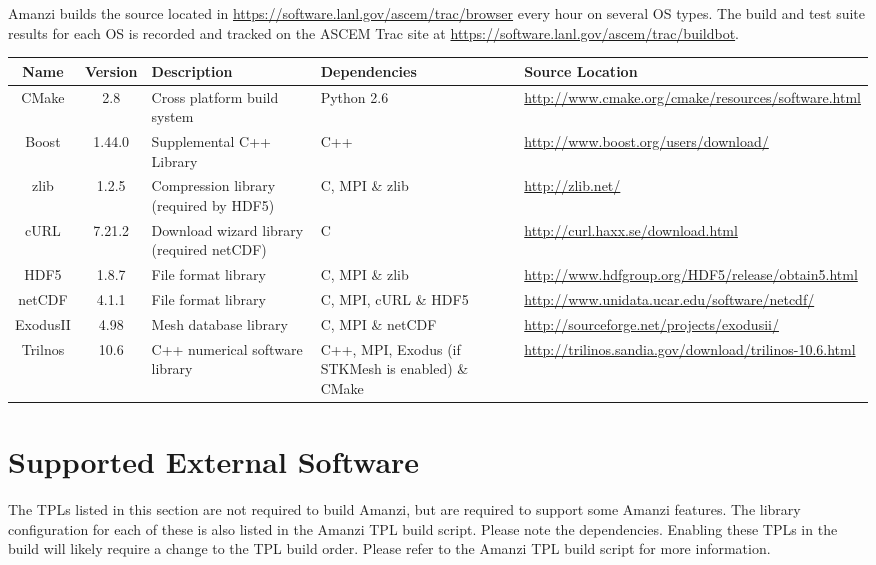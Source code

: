 \documentclass[12pt]{article}
\begin{document}
Amanzi builds the source located in \url{https://software.lanl.gov/ascem/trac/browser} every hour on several OS types.
The build and test suite results for each OS is recorded and tracked on the ASCEM Trac
site at \url{https://software.lanl.gov/ascem/trac/buildbot}. 

\begin{table}[htdp]
\begin{center}
\begin{tabular}{|c|c|p{3cm}|p{3cm}|p{3cm}|}
\hline
\hline
Name & Version & Description & Dependencies & Source Location \\
\hline
CMake & 2.8 & Cross platform build system & Python 2.6 & \url{http://www.cmake.org/cmake/resources/software.html}\\
\hline
Boost & 1.44.0 & Supplemental C++ Library & C++ &  \url{http://www.boost.org/users/download/}\\
\hline
zlib & 1.2.5 &Compression library (required by HDF5) & C, MPI \& zlib &  \url{http://zlib.net/} \\
\hline
cURL & 7.21.2 & Download wizard library (required netCDF) & C & \url{http://curl.haxx.se/download.html} \\
\hline
HDF5 &1.8.7 & File format library & C, MPI \& zlib & \url{http://www.hdfgroup.org/HDF5/release/obtain5.html} \\
\hline
netCDF & 4.1.1 & File format library & C, MPI, cURL \& HDF5 & \url{http://www.unidata.ucar.edu/software/netcdf/} \\
\hline
ExodusII & 4.98 & Mesh database library & C, MPI \& netCDF & \url{http://sourceforge.net/projects/exodusii/}\\
\hline
Trilnos & 10.6 & C++ numerical software library & C++, MPI, Exodus (if STKMesh is enabled) \& CMake & \url{http://trilinos.sandia.gov/download/trilinos-10.6.html} \\
\hline
\hline
\end{tabular}
\end{center}
\label{default}
\end{table}%


\section*{Supported External Software}
The TPLs listed in this section are not required to build Amanzi, but are required to support some Amanzi features. The 
library configuration for each of these is also listed in the Amanzi TPL build script. Please note the dependencies. Enabling
these TPLs in the build will likely require a change to the TPL build order. Please refer to the Amanzi TPL build script for
more information.
\end{document}
